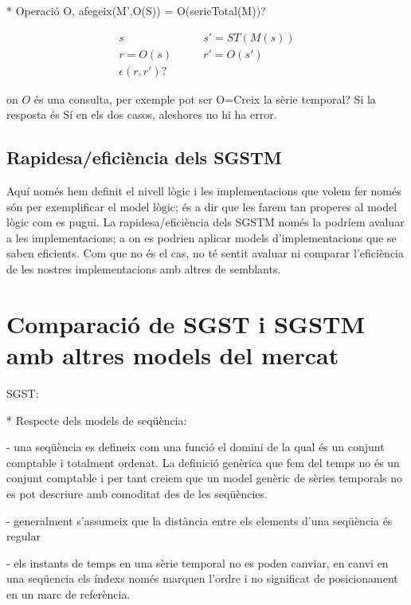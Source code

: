 * Operació O, afegeix(M',O(S)) = O(serieTotal(M))?


\begin{align*}
s   \qquad   &  s'=ST(M(s))\\
r=O(s) \qquad& r'=O(s') \\
\epsilon(r,r')?
\end{align*}

on $O$ és una consulta, per exemple pot ser O=Creix la sèrie temporal? Si la resposta és Sí en els dos casos, aleshores no hi ha error.



\subsection{Rapidesa/eficiència dels SGSTM}

Aquí només hem definit el nivell lògic i les implementacions que volem
fer només són per exemplificar el model lògic; és a dir que les farem
tan properes al model lògic com es pugui. La rapidesa/eficiència dels
SGSTM només la podríem avaluar a les implementacions; a on es podrien
aplicar models d'implementacions que se saben eficients. Com que no és
el cas, no té sentit avaluar ni comparar l'eficiència de les nostres
implementacions amb altres de semblants.







\section{Comparació de SGST i SGSTM amb altres models del mercat}


SGST:

* Respecte dels models de seqüència: 

  - una seqüència es defineix com una funció el domini de la qual és un conjunt comptable i totalment ordenat. La definició genèrica que fem del temps no és un conjunt comptable i per tant creiem que un model genèric de sèries temporals no es pot descriure amb comoditat des de les seqüències. 

  - generalment s'assumeix que la distància entre els elements d'una seqüència és regular

  - els instants de temps en una sèrie temporal no es poden canviar, en canvi en una seqüencia els índexs només marquen l'ordre i no significat de posicionament en un marc de referència.






